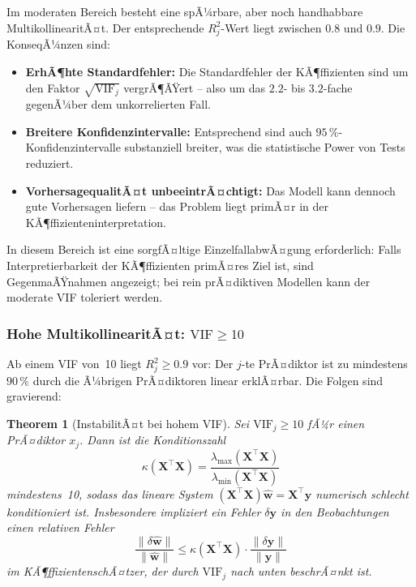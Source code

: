 ﻿\documentclass[12pt, a4paper]{article}
\newtheorem{theorem}{Theorem}[section]
\theoremstyle{definition}
\theoremstyle{remark}
\newcommand{\vw}{\bm{w}}
\newcommand{\vy}{\bm{y}}
\newcommand{\vX}{\bm{X}}
\newcommand{\T}{\top}
\begin{document}
Im moderaten Bereich besteht eine spÃ¼rbare, aber noch handhabbare MultikollinearitÃ¤t.
Der entsprechende $R_j^2$-Wert liegt zwischen $0.8$ und $0.9$. Die KonseqÃ¼nzen sind:
\begin{itemize}
	\item \textbf{ErhÃ¶hte Standardfehler:} Die Standardfehler der KÃ¶ffizienten sind um den
	Faktor $\sqrt{\mathrm{VIF}_j}$ vergrÃ¶ÃŸert -- also um das $2.2$- bis $3.2$-fache gegenÃ¼ber
	dem unkorrelierten Fall.
	\item \textbf{Breitere Konfidenzintervalle:} Entsprechend sind auch $95\,\%$-Konfidenzintervalle
	substanziell breiter, was die statistische Power von Tests reduziert.
	\item \textbf{VorhersagequalitÃ¤t unbeeintrÃ¤chtigt:} Das Modell kann dennoch gute
	Vorhersagen liefern -- das Problem liegt primÃ¤r in der KÃ¶ffizienteninterpretation.
\end{itemize}
In diesem Bereich ist eine sorgfÃ¤ltige EinzelfallabwÃ¤gung erforderlich: Falls Interpretierbarkeit
der KÃ¶ffizienten primÃ¤res Ziel ist, sind GegenmaÃŸnahmen angezeigt; bei rein prÃ¤diktiven
Modellen kann der moderate VIF toleriert werden.

\subsubsection{Hohe MultikollinearitÃ¤t: $\mathrm{VIF} \geq 10$}

Ab einem VIF von~10 liegt $R_j^2 \geq 0.9$ vor: Der $j$-te PrÃ¤diktor ist zu mindestens $90\,\%$
durch die Ã¼brigen PrÃ¤diktoren linear erklÃ¤rbar. Die Folgen sind gravierend:

\begin{theorem}[InstabilitÃ¤t bei hohem VIF]
	\label{thm:instability}
	Sei $\mathrm{VIF}_j \geq 10$ fÃ¼r einen PrÃ¤diktor $x_j$. Dann ist die Konditionszahl
	\[
	\kappa(\vX^\T\vX) = \frac{\lambda_{\max}(\vX^\T\vX)}{\lambda_{\min}(\vX^\T\vX)}
	\]
	mindestens~10, sodass das lineare System $(\vX^\T\vX)\hat{\vw} = \vX^\T\vy$ numerisch 
	schlecht konditioniert ist. Insbesondere impliziert ein Fehler $\delta\vy$ in den 
	Beobachtungen einen relativen Fehler
	\[
	\frac{\|\delta\hat{\vw}\|}{\|\hat{\vw}\|} \leq \kappa(\vX^\T\vX) \cdot \frac{\|\delta\vy\|}{\|\vy\|}
	\]
	im KÃ¶ffizientenschÃ¤tzer, der durch $\mathrm{VIF}_j$ nach unten beschrÃ¤nkt ist.
\end{theorem}
\end{document}
